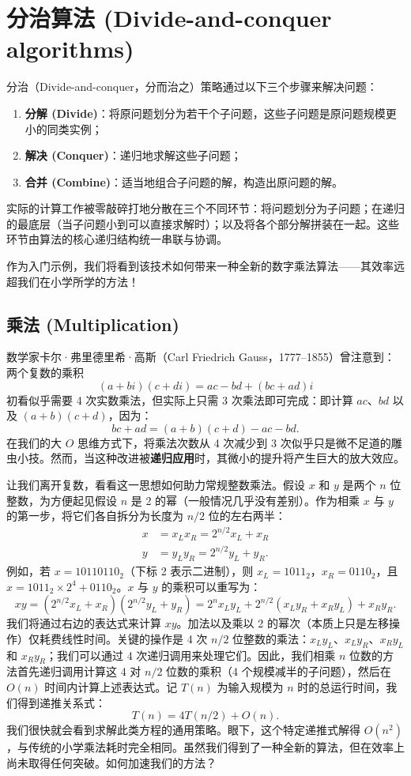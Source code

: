 \chapter{分治算法 (Divide-and-conquer algorithms)}

分治（Divide-and-conquer，分而治之）策略通过以下三个步骤来解决问题：
\begin{enumerate}
    \item \textbf{分解 (Divide)}：将原问题划分为若干个子问题，这些子问题是原问题规模更小的同类实例；
    \item \textbf{解决 (Conquer)}：递归地求解这些子问题；
    \item \textbf{合并 (Combine)}：适当地组合子问题的解，构造出原问题的解。
\end{enumerate}

实际的计算工作被零敲碎打地分散在三个不同环节：将问题划分为子问题；在递归的最底层（当子问题小到可以直接求解时）；以及将各个部分解拼装在一起。这些环节由算法的核心递归结构统一串联与协调。

作为入门示例，我们将看到该技术如何带来一种全新的数字乘法算法——其效率远超我们在小学所学的方法！

\section{乘法 (Multiplication)}

数学家卡尔·弗里德里希·高斯（Carl Friedrich Gauss，1777--1855）曾注意到：两个复数的乘积
\[
(a + bi)(c + di) = ac - bd + (bc + ad)i
\]
初看似乎需要 4 次实数乘法，但实际上只需 3 次乘法即可完成：即计算 $ac$、$bd$ 以及 $(a + b)(c + d)$，因为：
\[
bc + ad = (a + b)(c + d) - ac - bd.
\]
在我们的大 $O$ 思维方式下，将乘法次数从 4 次减少到 3 次似乎只是微不足道的雕虫小技。然而，当这种改进被\textbf{递归应用}时，其微小的提升将产生巨大的放大效应。

让我们离开复数，看看这一思想如何助力常规整数乘法。假设 $x$ 和 $y$ 是两个 $n$ 位整数，为方便起见假设 $n$ 是 2 的幂（一般情况几乎没有差别）。作为相乘 $x$ 与 $y$ 的第一步，将它们各自拆分为长度为 $n/2$ 位的左右两半：
\begin{align*}
x &= x_L x_R = 2^{n/2} x_L + x_R \\
y &= y_L y_R = 2^{n/2} y_L + y_R.
\end{align*}
例如，若 $x = 10110110_2$（下标 2 表示二进制），则 $x_L = 1011_2$，$x_R = 0110_2$，且 $x = 1011_2 \times 2^4 + 0110_2$。$x$ 与 $y$ 的乘积可以重写为：
\[
xy = (2^{n/2} x_L + x_R)(2^{n/2} y_L + y_R) = 2^n x_L y_L + 2^{n/2} (x_L y_R + x_R y_L) + x_R y_R.
\]
我们将通过右边的表达式来计算 $xy$。加法以及乘以 2 的幂次（本质上只是左移操作）仅耗费线性时间。关键的操作是 4 次 $n/2$ 位整数的乘法：$x_L y_L$、$x_L y_R$、$x_R y_L$ 和 $x_R y_R$；我们可以通过 4 次递归调用来处理它们。因此，我们相乘 $n$ 位数的方法首先递归调用计算这 4 对 $n/2$ 位数的乘积（4 个规模减半的子问题），然后在 $O(n)$ 时间内计算上述表达式。记 $T(n)$ 为输入规模为 $n$ 时的总运行时间，我们得到递推关系式：
\[
T(n) = 4T(n/2) + O(n).
\]
我们很快就会看到求解此类方程的通用策略。眼下，这个特定递推式解得 $O(n^2)$，与传统的小学乘法耗时完全相同。虽然我们得到了一种全新的算法，但在效率上尚未取得任何突破。如何加速我们的方法？

